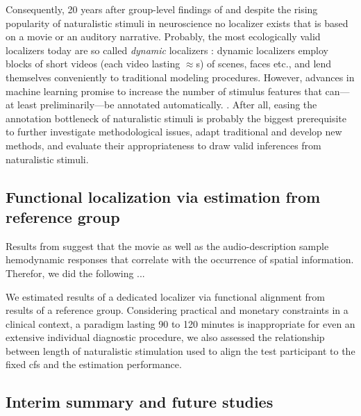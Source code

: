 %
Consequently, 20 years after group-level findings of \citep{bartels2004mapping}
and despite the rising popularity of naturalistic stimuli in neuroscience no
localizer exists that is based on a movie or an auditory narrative.
%
Probably, the most ecologically valid localizers today are so called
\textit{dynamic} localizers \citep[e.g.,][]{pitcher2011differential,
fox2009defining}:
%
dynamic localizers employ blocks of short videos (each video lasting
$\approx$\unit[2-3]{s}) of scenes, faces etc., and lend themselves conveniently
to traditional modeling procedures.
%
However, advances in machine learning promise to increase the number of stimulus
features that can---at least preliminarily---be annotated automatically.
\citep[cf., for example,
\href{https://neuroscout.org/}{\url{neuroscout.org}};][]{delavega2022neuroscout}.
%
After all, easing the annotation bottleneck of naturalistic stimuli is probably
the biggest prerequisite to further investigate methodological issues, adapt
traditional and develop new methods, and evaluate their appropriateness to draw
valid inferences from naturalistic stimuli.



\subsection{Functional localization via estimation from reference group}


%
Results from \citet{haeusler2022processing} suggest that the movie as well as
the audio-description sample hemodynamic responses that correlate with the
occurrence of spatial information.
%
Therefor, we did the following ...

We estimated results of a dedicated localizer \citep{sengupta2016extension} via
functional alignment from results of a reference group.
Considering practical and monetary constraints in a clinical context, a paradigm
lasting 90 to 120 minutes is inappropriate for even an extensive individual
diagnostic procedure, we also assessed the relationship between length of
naturalistic stimulation used to align the test participant to the fixed
\ac{cfs} and the estimation performance.



\subsection{Interim summary and future studies}

